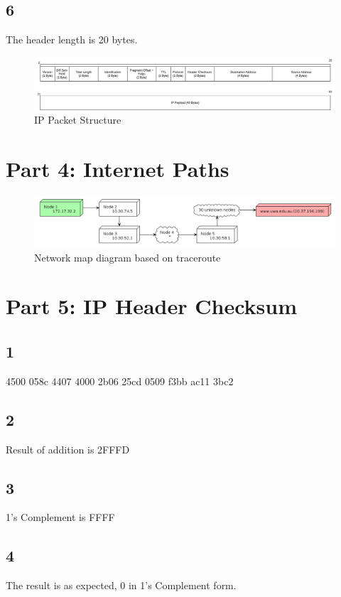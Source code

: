 \documentclass{article}
\begin{document}
    \subsection*{6}
    The header length is 20 bytes.
    \begin{figure}[htbp]
        \centering
        \includegraphics[width=\textwidth]{images/part3.drawio.png}
        \caption{IP Packet Structure}
    \end{figure}
    \section*{Part 4: Internet Paths}
    
    \clearpage
    \begin{figure}[htbp]
        \centering
        \includegraphics[width=\textwidth]{images/part4.plantuml.png}
        \caption{Network map diagram based on traceroute}
    \end{figure}
    \section*{Part 5: IP Header Checksum}
    \subsection*{1}
    4500 058c 4407 4000 2b06 25cd 0509 f3bb ac11 3bc2
    \subsection*{2}
    Result of addition is 2FFFD
    \subsection*{3}
    1's Complement is FFFF
    \subsection*{4}
    The result is as expected, 0 in 1's Complement form.
\end{document}
